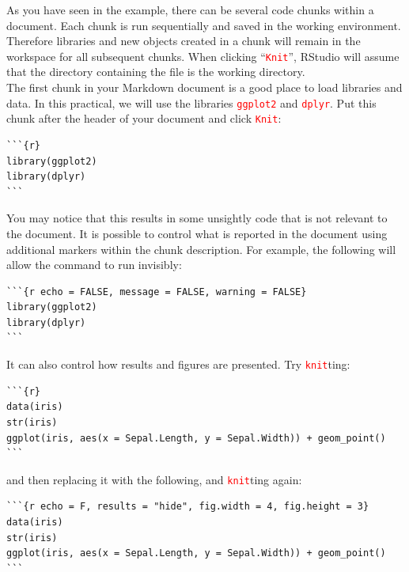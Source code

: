 \documentclass[a4paper,12pt]{article}
\newcommand\code[1]{\textcolor{red}{\texttt{#1}}}
\begin{document}
As you have seen in the example, there can be several code chunks within a document. Each chunk is run sequentially and saved in the working environment. Therefore libraries and new objects created in a chunk will remain in the workspace for all subsequent chunks. When clicking ``\code{Knit}'', RStudio will assume that the directory containing the file is the working directory. \\

The first chunk in your Markdown document is a good place to load libraries and data. In this practical, we will use the libraries \code{ggplot2} and \code{dplyr}. Put this chunk after the header of your document and click \code{Knit}:

\begin{shaded}
\begin{verbatim}
```{r}
library(ggplot2)
library(dplyr)
```
\end{verbatim}
\end{shaded}

You may notice that this results in some unsightly code that is not relevant to the document. It is possible to control what is reported in the document using additional markers within the chunk description. For example, the following will allow the command to run invisibly:

\begin{shaded}
\begin{verbatim}
```{r echo = FALSE, message = FALSE, warning = FALSE}
library(ggplot2)
library(dplyr)
```
\end{verbatim}
\end{shaded}

It can also control how results and figures are presented. Try \code{knit}ting:

\begin{shaded}
\begin{verbatim}
```{r}
data(iris)
str(iris)
ggplot(iris, aes(x = Sepal.Length, y = Sepal.Width)) + geom_point()
```
\end{verbatim}
\end{shaded}

and then replacing it with the following, and \code{knit}ting again:

\begin{shaded}
\begin{verbatim}
```{r echo = F, results = "hide", fig.width = 4, fig.height = 3}
data(iris)
str(iris)
ggplot(iris, aes(x = Sepal.Length, y = Sepal.Width)) + geom_point()
```
\end{verbatim}
\end{shaded}
\end{document}
